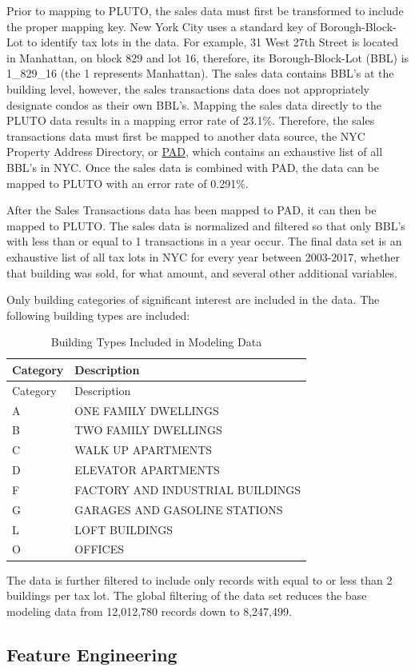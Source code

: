 \documentclass[12pt,]{article}
\begin{document}
Prior to mapping to PLUTO, the sales data must first be transformed to
include the proper mapping key. New York City uses a standard key of
Borough-Block-Lot to identify tax lots in the data. For example, 31 West
27th Street is located in Manhattan, on block 829 and lot 16, therefore,
its Borough-Block-Lot (BBL) is 1\_829\_16 (the 1 represents Manhattan).
The sales data contains BBL's at the building level, however, the sales
transactions data does not appropriately designate condos as their own
BBL's. Mapping the sales data directly to the PLUTO data results in a
mapping error rate of 23.1\%. Therefore, the sales transactions data
must first be mapped to another data source, the NYC Property Address
Directory, or
\href{https://data.cityofnewyork.us/City-Government/Property-Address-Directory/bc8t-ecyu/data}{PAD},
which contains an exhaustive list of all BBL's in NYC. Once the sales
data is combined with PAD, the data can be mapped to PLUTO with an error
rate of 0.291\%.

After the Sales Transactions data has been mapped to PAD, it can then be
mapped to PLUTO. The sales data is normalized and filtered so that only
BBL's with less than or equal to 1 transactions in a year occur. The
final data set is an exhaustive list of all tax lots in NYC for every
year between 2003-2017, whether that building was sold, for what amount,
and several other additional variables.

Only building categories of significant interest are included in the
data. The following building types are included:

\begin{longtable}[]{@{}ll@{}}
\caption{Building Types Included in Modeling Data}\tabularnewline
\toprule
Category & Description\tabularnewline
\midrule
\endfirsthead
\toprule
Category & Description\tabularnewline
\midrule
\endhead
A & ONE FAMILY DWELLINGS\tabularnewline
B & TWO FAMILY DWELLINGS\tabularnewline
C & WALK UP APARTMENTS\tabularnewline
D & ELEVATOR APARTMENTS\tabularnewline
F & FACTORY AND INDUSTRIAL BUILDINGS\tabularnewline
G & GARAGES AND GASOLINE STATIONS\tabularnewline
L & LOFT BUILDINGS\tabularnewline
O & OFFICES\tabularnewline
\bottomrule
\end{longtable}

The data is further filtered to include only records with equal to or
less than 2 buildings per tax lot. The global filtering of the data set
reduces the base modeling data from 12,012,780 records down to
8,247,499.

\hypertarget{feature-engineering}{%
\subsection{Feature Engineering}\label{feature-engineering}}
\end{document}
